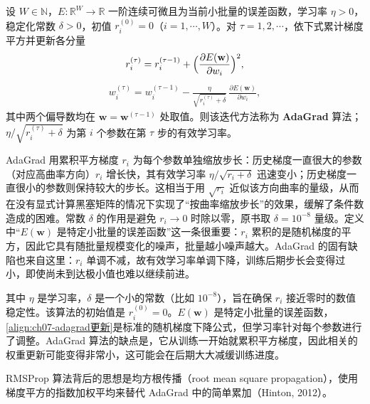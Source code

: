 \documentclass[../../main.tex]{subfiles}
\begin{document}
\begin{definition}[AdaGrad]\label{definition:ch07-AdaGrad}
设 $W\in\mathbb{N}$，$E:\mathbb{R}^{W}\to\mathbb{R}$ 一阶连续可微且为当前小批量的误差函数，学习率 $\eta>0$，稳定化常数 $\delta>0$，初值 $r_{i}^{(0)}=0$（$i=1,\cdots,W$）。对 $\tau=1,2,\cdots$，依下式累计梯度平方并更新各分量
\begin{align}
r_i^{(\tau)} = r_i^{(\tau-1)}+\Bigl(\frac{\partial E(\mathbf{w})}{\partial w_i}\Bigr)^{2},
\label{align:ch07-adagrad}
\end{align}
\begin{align}
w_i^{(\tau)} = w_i^{(\tau-1)}-\frac{\eta}{\sqrt{r_i^{(\tau)}+\delta}}\,\frac{\partial E(\mathbf{w})}{\partial w_i},
\label{align:ch07-adagrad更新}
\end{align}
其中两个偏导数均在 $\mathbf{w}=\mathbf{w}^{(\tau-1)}$ 处取值。则该迭代方法称为 \textbf{AdaGrad} 算法；$\eta/\sqrt{r_{i}^{(\tau)}+\delta}$ 为第 $i$ 个参数在第 $\tau$ 步的有效学习率。
\end{definition}

\begin{remark}
AdaGrad 用累积平方梯度 $r_i$ 为每个参数单独缩放步长：历史梯度一直很大的参数（对应高曲率方向）$r_i$ 增长快，其有效学习率 $\eta/\sqrt{r_i+\delta}$ 迅速变小；历史梯度一直很小的参数则保持较大的步长。这相当于用 $\sqrt{r_i}$ 近似该方向曲率的量级，从而在没有显式计算黑塞矩阵的情况下实现了“按曲率缩放步长”的效果，缓解了条件数造成的困难。常数 $\delta$ 的作用是避免 $r_i\to0$ 时除以零，原书取 $\delta=10^{-8}$ 量级。定义中“$E(\mathbf{w})$ 是特定小批量的误差函数”这一条很重要：$r_i$ 累积的是随机梯度的平方，因此它具有随批量规模变化的噪声，批量越小噪声越大。AdaGrad 的固有缺陷也来自这里：$r_i$ 单调不减，故有效学习率单调下降，训练后期步长会变得过小，即使尚未到达极小值也难以继续前进。
\end{remark}

其中 $\eta$ 是学习率，$\delta$ 是一个小的常数（比如 $10^{-8}$），旨在确保 $r_i$ 接近零时的数值稳定性。该算法的初始值是 $r_i^{(0)}=0$。$E(\mathbf{w})$ 是特定小批量的误差函数，\eqref{align:ch07-adagrad更新}是标准的随机梯度下降公式，但学习率针对每个参数进行了调整。AdaGrad 算法的缺点是，它从训练一开始就累积平方梯度，因此相关的权重更新可能变得非常小，这可能会在后期大大减缓训练进度。

RMSProp 算法背后的思想是均方根传播（root mean square propagation），使用梯度平方的指数加权平均来替代 AdaGrad 中的简单累加（Hinton, 2012）。
\end{document}
